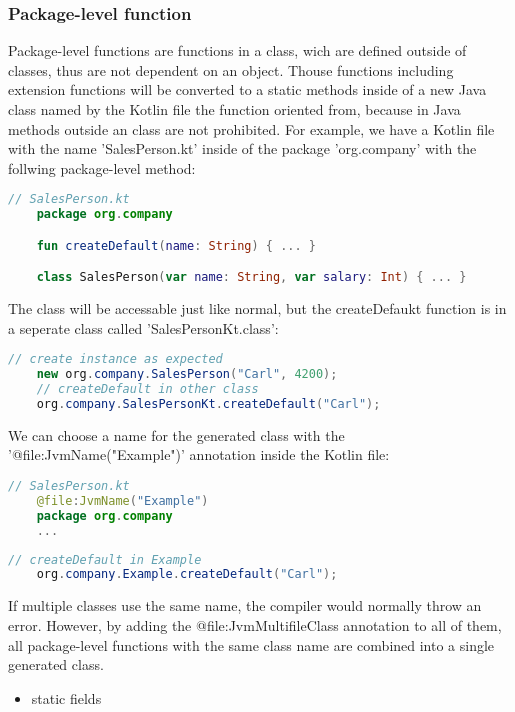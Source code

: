 \documentclass[a4paper, 11pt]{article}
\begin{document}
\subsubsection{Package-level function}
  Package-level functions are functions in a class, wich are defined outside of classes, thus are not dependent on an object. Thouse functions including extension functions will be converted to a static methods inside of a new Java class named by the Kotlin file the function oriented from, because in Java methods outside an class are not prohibited. For example, we have a Kotlin file with the name 'SalesPerson.kt' inside of the package 'org.company' with the follwing package-level method:
  \begin{lstlisting}[language=Kotlin]
    // SalesPerson.kt
    package org.company

    fun createDefault(name: String) { ... }

    class SalesPerson(var name: String, var salary: Int) { ... }
  \end{lstlisting}
  The class will be accessable just like normal, but the createDefaukt function is in a seperate class called 'SalesPersonKt.class':
  \begin{lstlisting}[language=Java]
    // create instance as expected
    new org.company.SalesPerson("Carl", 4200);
    // createDefault in other class
    org.company.SalesPersonKt.createDefault("Carl");
  \end{lstlisting}
  We can choose a name for the generated class with the '@file:JvmName("Example")' annotation inside the Kotlin file:
  \begin{lstlisting}[language=Kotlin]
    // SalesPerson.kt
    @file:JvmName("Example")
    package org.company
    ...
  \end{lstlisting}
  \begin{lstlisting}[language=Java]
    // createDefault in Example
    org.company.Example.createDefault("Carl");
  \end{lstlisting}
  If multiple classes use the same name, the compiler would normally throw an error. However, by adding the @file:JvmMultifileClass annotation to all of them, all package-level functions with the same class name are combined into a single generated class. 

  \begin{itemize}
    \item static fields
  \end{itemize}
\end{document}
